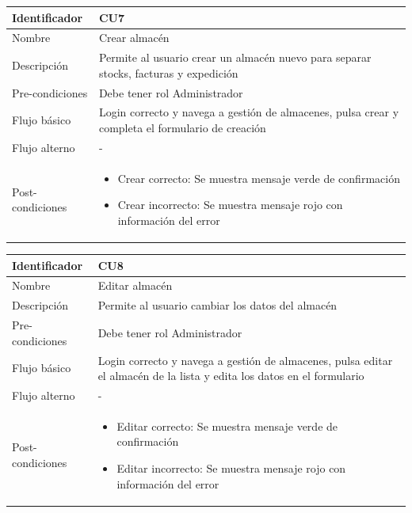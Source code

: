 \vspace{1em}
\par
\begin{tabular}{||p{3cm}|p{11cm}||} 
\hline
Identificador & CU7 \\ [0.5ex] 
\hline\hline
Nombre & Crear almacén \\ 
\hline
Descripción & Permite al usuario crear un almacén nuevo para separar stocks, facturas y expedición \\
\hline
Pre-condiciones & Debe tener rol Administrador \\
\hline
Flujo básico & Login correcto y navega a gestión de almacenes, pulsa crear y completa el formulario de creación \\
\hline
Flujo alterno & - \\
\hline
Post-condiciones &
\begin{itemize}
    \item Crear correcto: Se muestra mensaje verde de confirmación
    \item Crear incorrecto: Se muestra mensaje rojo con información del error
\end{itemize} \\
\hline
\end{tabular}

\vspace{1em}
\par
\begin{tabular}{||p{3cm}|p{11cm}||} 
\hline
Identificador & CU8 \\ [0.5ex] 
\hline\hline
Nombre & Editar almacén \\ 
\hline
Descripción & Permite al usuario cambiar los datos del almacén \\
\hline
Pre-condiciones & Debe tener rol Administrador \\
\hline
Flujo básico & Login correcto y navega a gestión de almacenes, pulsa editar el almacén de la lista y edita los datos en el formulario \\
\hline
Flujo alterno & - \\
\hline
Post-condiciones &
\begin{itemize}
    \item Editar correcto: Se muestra mensaje verde de confirmación
    \item Editar incorrecto: Se muestra mensaje rojo con información del error
\end{itemize} \\
\hline
\end{tabular}

